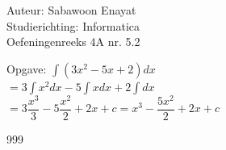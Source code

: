 \documentclass[a4paper]{article}
\begin{document}
  
\noindent \large Auteur: Sabawoon Enayat \\
\noindent \large Studierichting: Informatica\\
\noindent \large Oefeningenreeks 4A nr. 5.2 \\

\newcommand{\dint}{\displaystyle\int}

\medskip

\normalsize

Opgave: $\dint (3x^2 - 5x + 2) dx$\\

$= 3\dint x^2 dx - 5\dint x dx + 2\dint dx$\\

$= 3 \dfrac{x^3}{3} - 5 \dfrac{x^2}{2} + 2x + c = x^3 - \dfrac{5x^2}{2} + 2x + c$\\

\begin{thebibliography}{999}
\end{thebibliography}
\end{document}
